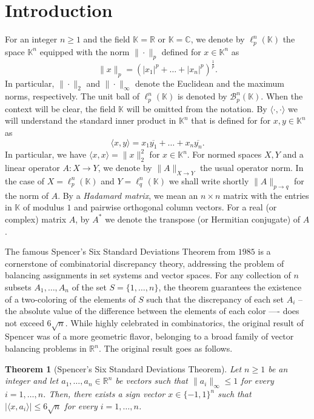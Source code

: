 \documentclass[12pt, a4paper]{article}
\theoremstyle{plain} %
\newtheorem{theorem}{Theorem}[section] %
\theoremstyle{definition} %
\theoremstyle{remark} %
\begin{document}
\section{Introduction}

For an integer $n \geq 1$ and the field $\mathbb{K}=\mathbb{R}$ or $\mathbb{K}=\mathbb{C}$, we denote by $\ell_p^n(\mathbb{K})$ the space $\mathbb{K}^n$ equipped with the norm $\| \cdot \|_p$ defined for $x \in \mathbb{K}^n$ as
$$\|x\|_p = \left ( |x_1|^p + \ldots + |x_n|^p \right )^{\frac{1}{p}}.$$
In particular, $\| \cdot \|_2$ and $\| \cdot \|_{\infty}$ denote the Euclidean and the maximum norms, respectively. The unit ball of $\ell_p^n(\mathbb{K})$ is denoted by $\mathcal{B}_p^n(\mathbb{K})$. When the context will be clear, the field $\mathbb{K}$ will be omitted from the notation. By $\langle \cdot, \cdot \rangle$ we will understand the standard inner product in $\mathbb{K}^n$ that is defined for for $x, y \in \mathbb{K}^n$ as
$$\langle x, y \rangle = x_1 \overline{y_1} + \ldots + x_n\overline{y_n}.$$
In particular, we have $\langle x, x \rangle = \|x\|^2_2$ for $x \in \mathbb{K}^n$. For normed spaces $X, Y$ and a linear operator $A: X \to Y$, we denote by $\|A\|_{X \to Y}$ the usual operator norm. In the case of $X = \ell_p^n(\mathbb{K})$ and $Y=\ell_q^n(\mathbb{K})$ we shall write shortly $\|A\|_{p \to q}$ for the norm of $A$.  By a \emph{Hadamard matrix}, we mean an $n \times n$ matrix with the entries in $\mathbb{K}$ of modulus $1$ and pairwise orthogonal column vectors. For a real (or complex) matrix $A$, by $A^*$ we denote the transpose (or Hermitian conjugate) of $A$.

The famous Spencer's Six Standard Deviations Theorem from $1985$ \cite{spencer} is a cornerstone of combinatorial discrepancy theory, addressing the problem of balancing assignments in set systems and vector spaces. For any collection of $n$ subsets $A_1, \ldots, A_n$ of the set $S=\{1, \ldots, n\}$, the theorem guarantees the existence of a two-coloring of the elements of $S$ such that the discrepancy of each set $A_i$ -- the absolute value of the difference between the elements of each color —- does not exceed $6 \sqrt{n}$. While highly celebrated in combinatorics, the original result of Spencer was of a more geometric flavor, belonging to a broad family of vector balancing problems in $\mathbb{R}^n$. The original result goes as follows.

\begin{theorem}[Spencer's Six Standard Deviations Theorem]
\label{thmspencer}
Let $n \geq 1$ be an integer and let $a_1, \ldots, a_n \in \mathbb{R}^n$ be vectors such that $\|a_i\|_{\infty} \leq 1$ for every $i=1, \ldots, n$. Then, there exists a sign vector $x \in \{-1, 1\}^n$ such that $|\langle x, a_i \rangle| \leq 6 \sqrt{n}$ for every $i=1, \ldots, n$.
\end{theorem}
\end{document}
